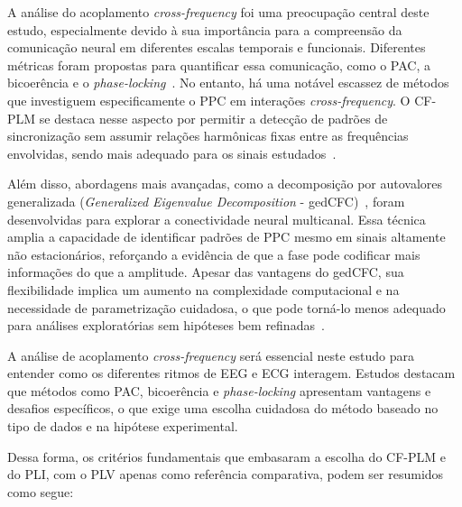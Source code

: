 A análise do acoplamento \textit{cross-frequency} foi uma preocupação central deste estudo, especialmente devido à sua importância para a compreensão da comunicação neural em diferentes escalas temporais e funcionais. Diferentes métricas foram propostas para quantificar essa comunicação, como o PAC, a bicoerência e o \textit{phase-locking}~\cite{hulsemann2019quantification}. No entanto, há uma notável escassez de métodos que investiguem especificamente o PPC em interações \textit{cross-frequency}. O CF-PLM se destaca nesse aspecto por permitir a detecção de padrões de sincronização sem assumir relações harmônicas fixas entre as frequências envolvidas, sendo mais adequado para os sinais estudados~\cite{sorrentino2022detection, seraj2018cerebral, chen2023multiple}.

Além disso, abordagens mais avançadas, como a decomposição por autovalores generalizada (\textit{Generalized Eigenvalue Decomposition} - gedCFC)~\cite{cohen2017where}, foram desenvolvidas para explorar a conectividade neural multicanal. Essa técnica amplia a capacidade de identificar padrões de PPC mesmo em sinais altamente não estacionários, reforçando a evidência de que a fase pode codificar mais informações do que a amplitude. Apesar das vantagens do gedCFC, sua flexibilidade implica um aumento na complexidade computacional e na necessidade de parametrização cuidadosa, o que pode torná-lo menos adequado para análises exploratórias sem hipóteses bem refinadas~\cite{cohen2017multivariate}.

A análise de acoplamento \textit{cross-frequency} será essencial neste estudo para entender como os diferentes ritmos de EEG e ECG interagem. Estudos \cite{hulsemann2019quantification} destacam que métodos como PAC, bicoerência e \textit{phase-locking} apresentam vantagens e desafios específicos, o que exige uma escolha cuidadosa do método baseado no tipo de dados e na hipótese experimental.

Dessa forma, os critérios fundamentais que embasaram a escolha do CF-PLM e do PLI, com o PLV apenas como referência comparativa, podem ser resumidos como segue:

